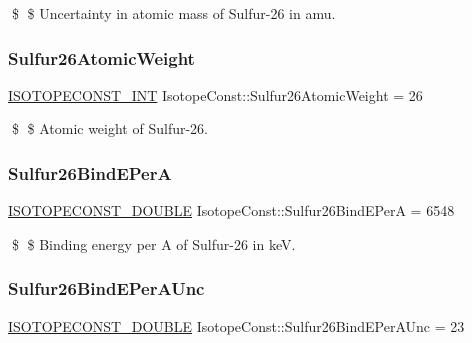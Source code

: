 \$ \$ Uncertainty in atomic mass of Sulfur-\/26 in amu. \mbox{\label{group___isotope_const-_sulfur-_s26_gacae4626a4f88bd66326b313fe0a1895b}} 
\subsubsection{\texorpdfstring{Sulfur26\+Atomic\+Weight}{Sulfur26AtomicWeight}}
{\footnotesize\ttfamily \mbox{\hyperlink{group___isotope_const-_macros_ga5f18360b3e99483a35c32d789e62621c}{I\+S\+O\+T\+O\+P\+E\+C\+O\+N\+S\+T\+\_\+\+I\+NT}} Isotope\+Const\+::\+Sulfur26\+Atomic\+Weight = 26}

\$ \$ Atomic weight of Sulfur-\/26. \mbox{\label{group___isotope_const-_sulfur-_s26_ga8785f5db6cbac0e2972671883c1f8164}} 
\subsubsection{\texorpdfstring{Sulfur26\+Bind\+E\+PerA}{Sulfur26BindEPerA}}
{\footnotesize\ttfamily \mbox{\hyperlink{group___isotope_const-_macros_ga8f45a7272ce02c0b4c65c44636ed719a}{I\+S\+O\+T\+O\+P\+E\+C\+O\+N\+S\+T\+\_\+\+D\+O\+U\+B\+LE}} Isotope\+Const\+::\+Sulfur26\+Bind\+E\+PerA = 6548}

\$ \$ Binding energy per A of Sulfur-\/26 in keV. \mbox{\label{group___isotope_const-_sulfur-_s26_ga68929dfba46de0bf15554e9e47dced06}} 
\subsubsection{\texorpdfstring{Sulfur26\+Bind\+E\+Per\+A\+Unc}{Sulfur26BindEPerAUnc}}
{\footnotesize\ttfamily \mbox{\hyperlink{group___isotope_const-_macros_ga8f45a7272ce02c0b4c65c44636ed719a}{I\+S\+O\+T\+O\+P\+E\+C\+O\+N\+S\+T\+\_\+\+D\+O\+U\+B\+LE}} Isotope\+Const\+::\+Sulfur26\+Bind\+E\+Per\+A\+Unc = 23}

